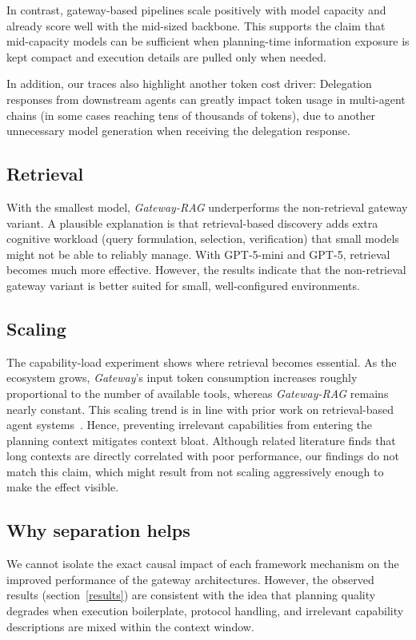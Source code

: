 In contrast, gateway-based pipelines scale positively with model capacity and already score well with the mid-sized backbone.
This supports the claim that mid-capacity models can be sufficient when planning-time information exposure is kept compact and execution details are pulled only when needed.

In addition, our traces also highlight another token cost driver: 
Delegation responses from downstream agents can greatly impact token usage in multi-agent chains (in some cases reaching tens of thousands of tokens), due to another unnecessary model generation when receiving the delegation response.

\subsection{Retrieval}
With the smallest model, \emph{Gateway-RAG} underperforms the non-retrieval gateway variant.
A plausible explanation is that retrieval-based discovery adds extra cognitive workload (query formulation, selection, verification) that small models might not be able to reliably manage.
With GPT-5-mini and GPT-5, retrieval becomes much more effective.
However, the results indicate that the non-retrieval gateway variant is better suited for small, well-configured environments.

\subsection{Scaling}
The capability-load experiment shows where retrieval becomes essential.
As the ecosystem grows, \emph{Gateway}'s input token consumption increases roughly proportional to the number of available tools, whereas \emph{Gateway-RAG} remains nearly constant.
This scaling trend is in line with prior work on retrieval-based agent systems~\cite{gaurav2025dynamicreact, gan2025ragmcp, fei2025mcpzero, lumer2025tooltoagent, lumer2025scalemcp, gaurav2025codemem}.
Hence, preventing irrelevant capabilities from entering the planning context mitigates context bloat.
Although related literature finds that long contexts are directly correlated with poor performance, our findings do not match this claim, which might result from not scaling aggressively enough to make the effect visible.

\subsection{Why separation helps}
We cannot isolate the exact causal impact of each framework mechanism on the improved performance of the gateway architectures.
However, the observed results (section~\ref{results}) are consistent with the idea that planning quality degrades when execution boilerplate, protocol handling, and irrelevant capability descriptions are mixed within the context window.

